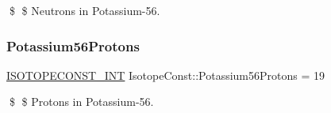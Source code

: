 \$ \$ Neutrons in Potassium-\/56. \mbox{\label{group___isotope_const-_potassium-_k56_ga811c7c8235e08c3f40f7a4095fa99cb5}} 
\subsubsection{\texorpdfstring{Potassium56\+Protons}{Potassium56Protons}}
{\footnotesize\ttfamily \mbox{\hyperlink{group___isotope_const-_macros_ga5f18360b3e99483a35c32d789e62621c}{I\+S\+O\+T\+O\+P\+E\+C\+O\+N\+S\+T\+\_\+\+I\+NT}} Isotope\+Const\+::\+Potassium56\+Protons = 19}

\$ \$ Protons in Potassium-\/56. 